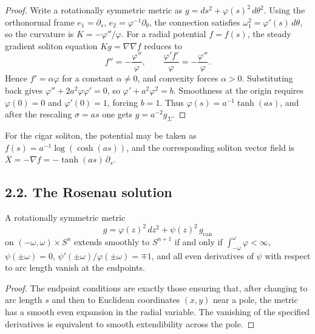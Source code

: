\begin{proof}
\sketch Write a rotationally symmetric metric as \(g=ds^2+\varphi(s)^2\,d\theta^2\).
Using the orthonormal frame \(e_1=\partial_s\), \(e_2=\varphi^{-1}\partial_\theta\),
the connection satisfies \(\omega^2_1=\varphi'(s)\,d\theta\), so the curvature is
\(K=-\varphi''/\varphi\). For a radial potential \(f=f(s)\), the steady gradient
soliton equation \(Kg=\nabla\nabla f\) reduces to
\[
f''=-\frac{\varphi''}{\varphi},\qquad
\frac{\varphi' f'}{\varphi}=-\frac{\varphi''}{\varphi}.
\]
Hence \(f'=\alpha\varphi\) for a constant \(\alpha\neq 0\), and convexity forces
\(\alpha>0\). Substituting back gives \(\varphi''+2a^2\varphi\varphi'=0\), so
\(\varphi'+a^2\varphi^2=b\). Smoothness at the origin requires
\(\varphi(0)=0\) and \(\varphi'(0)=1\), forcing \(b=1\). Thus
\(\varphi(s)=a^{-1}\tanh(as)\), and after the rescaling \(\sigma=as\) one gets
\(g=a^{-2}g_\Sigma\).
\end{proof}

\begin{remark}
\label{ch02-rem-cigars-potential}
For the cigar soliton, the potential may be taken as
\(f(s)=a^{-1}\log(\cosh(as))\), and the corresponding soliton vector field is
\(X=-\nabla f=-\tanh(as)\,\partial_s\).
\end{remark}

\subsection*{2.2. The Rosenau solution}

\begin{lemma}
\label{ch02-lem-cylinder-to-sphere}
A rotationally symmetric metric
\[
g=\varphi(z)^2\,dz^2+\psi(z)^2\,g_{\mathrm{can}}
\]
on \((-\omega,\omega)\times S^n\) extends smoothly to \(S^{n+1}\) if and only if
\(\int_{-\omega}^{\omega}\varphi<\infty\), \(\psi(\pm\omega)=0\),
\(\psi'(\pm\omega)/\varphi(\pm\omega)=\mp 1\), and all even derivatives of
\(\psi\) with respect to arc length vanish at the endpoints.
\end{lemma}

\begin{proof}
\sketch The endpoint conditions are exactly those ensuring that, after changing to arc
length \(s\) and then to Euclidean coordinates \((x,y)\) near a pole, the metric
has a smooth even expansion in the radial variable. The vanishing of the
specified derivatives is equivalent to smooth extendibility across the pole.
\end{proof}

